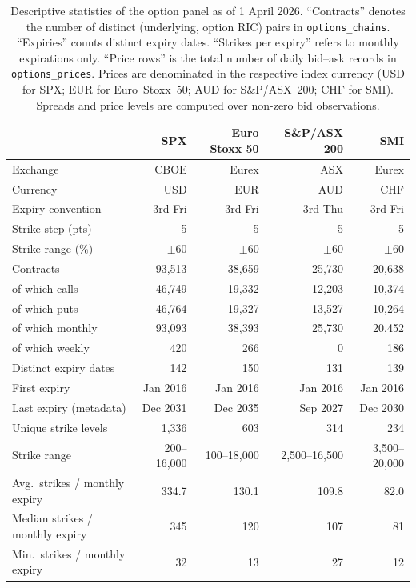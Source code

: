 \documentclass[12pt]{article}
\begin{document}
\begin{table}[ht]
\centering
\caption{Descriptive statistics of the option panel as of 1 April 2026.
``Contracts'' denotes the number of distinct (underlying, option RIC) pairs
in \texttt{options\_chains}. ``Expiries'' counts distinct expiry dates.
``Strikes per expiry'' refers to monthly expirations only.
``Price rows'' is the total number of daily bid--ask records in
\texttt{options\_prices}. Prices are denominated in the respective index
currency (USD for SPX; EUR for Euro~Stoxx~50; AUD for S\&P/ASX~200;
CHF for SMI). Spreads and price levels are computed over non-zero bid
observations.}
\label{tab:desc}
\small
\begin{tabular}{lrrrr}
\toprule
 & \textbf{SPX} & \textbf{Euro Stoxx 50} & \textbf{S\&P/ASX 200} & \textbf{SMI} \\
\midrule
Exchange & CBOE & Eurex & ASX & Eurex \\
Currency & USD & EUR & AUD & CHF \\
Expiry convention & 3rd Fri & 3rd Fri & 3rd Thu & 3rd Fri \\
Strike step (pts) & 5 & 5 & 5 & 5 \\
Strike range (\%) & $\pm60$ & $\pm60$ & $\pm60$ & $\pm60$ \\
\midrule
Contracts & 93{,}513 & 38{,}659 & 25{,}730 & 20{,}638 \\
\quad of which calls & 46{,}749 & 19{,}332 & 12{,}203 & 10{,}374 \\
\quad of which puts & 46{,}764 & 19{,}327 & 13{,}527 & 10{,}264 \\
\quad of which monthly & 93{,}093 & 38{,}393 & 25{,}730 & 20{,}452 \\
\quad of which weekly & 420 & 266 & 0 & 186 \\
Distinct expiry dates & 142 & 150 & 131 & 139 \\
First expiry & Jan 2016 & Jan 2016 & Jan 2016 & Jan 2016 \\
Last expiry (metadata) & Dec 2031 & Dec 2035 & Sep 2027 & Dec 2030 \\
Unique strike levels & 1{,}336 & 603 & 314 & 234 \\
Strike range & 200--16{,}000 & 100--18{,}000 & 2{,}500--16{,}500 & 3{,}500--20{,}000 \\
\midrule
Avg.\ strikes / monthly expiry & 334.7 & 130.1 & 109.8 & 82.0 \\
Median strikes / monthly expiry & 345 & 120 & 107 & 81 \\
Min.\ strikes / monthly expiry & 32 & 13 & 27 & 12 \\

\end{tabular}
\end{table}
\end{document}
